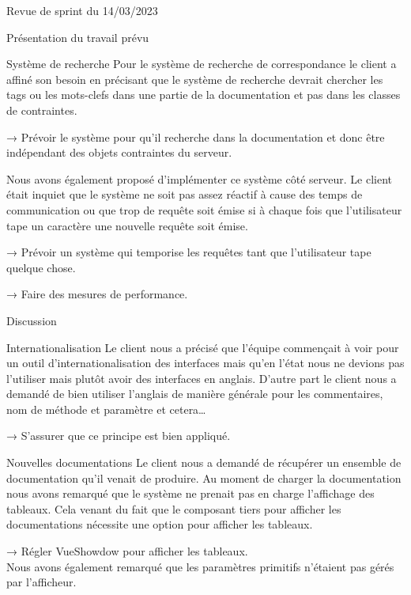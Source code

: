 \documentclass[]{article}
\begin{document}
{\begin{section}{Revue de sprint du 14/03/2023}
 \begin{subsection}{Présentation du travail prévu}
     \begin{subsubsection}{Système de recherche}
         Pour le système de recherche de correspondance le client a affiné son besoin en précisant que le système de recherche devrait chercher les tags ou les mots-clefs dans une partie de la documentation et pas dans les classes de contraintes.

         → Prévoir le système pour qu’il recherche dans la documentation et donc être indépendant des objets contraintes du serveur.

         Nous avons également proposé d’implémenter ce système côté serveur. Le client était inquiet que le système ne soit pas assez réactif à cause des temps de communication ou que trop de requête soit émise si à chaque fois que l’utilisateur tape un caractère une nouvelle requête soit émise.

         → Prévoir un système qui temporise les requêtes tant que l’utilisateur tape quelque chose.

         → Faire des mesures de performance.
     \end{subsubsection}
 \end{subsection}

 \begin{subsection}{Discussion}
     \begin{subsubsection}{Internationalisation}
         Le client nous a précisé que l’équipe commençait à voir pour un outil d’internationalisation des interfaces mais qu’en l’état nous ne devions pas l’utiliser mais plutôt avoir des interfaces en anglais. D’autre part le client nous a demandé de bien utiliser l’anglais de manière générale pour les commentaires, nom de méthode et paramètre et cetera…

         → S’assurer que ce principe est bien appliqué.
     \end{subsubsection}

     \begin{subsubsection}{Nouvelles documentations}
         Le client nous a demandé de récupérer un ensemble de documentation qu’il venait de produire. Au moment de charger la documentation nous avons remarqué que le système ne prenait pas en charge l’affichage des tableaux. Cela venant du fait que le composant tiers pour afficher les documentations nécessite une option pour afficher les tableaux.

         → Régler VueShowdow pour afficher les tableaux.
         \\[5mm]
         Nous avons également remarqué que les paramètres primitifs n’étaient pas gérés par l’afficheur.


\end{subsubsection}
\end{subsection}
\end{section}}
\end{document}
